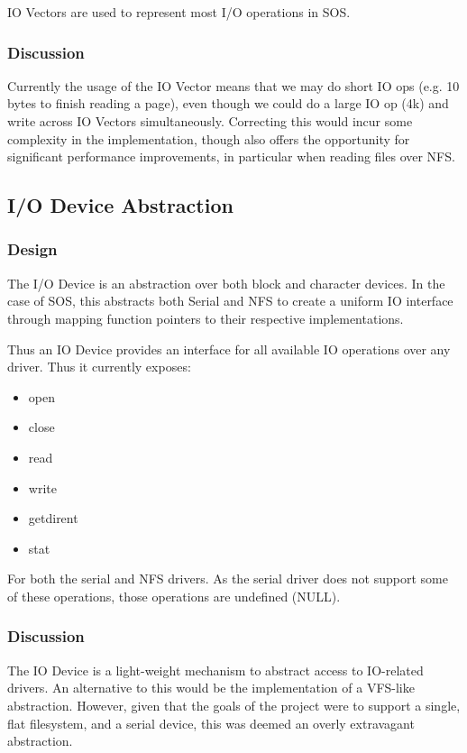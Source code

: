 \documentclass[a4paper,12pt]{article}
\begin{document}
IO Vectors are used to represent most I/O operations in SOS.

\subsubsection{Discussion}
Currently the usage of the IO Vector means that we may do short IO ops
(e.g. 10 bytes to finish reading a page), even though we could do a large IO
op (4k) and write across IO Vectors simultaneously.  Correcting this would
incur some complexity in the implementation, though also offers the
opportunity for significant performance improvements, in particular when
reading files over NFS.


\subsection{I/O Device Abstraction}
\subsubsection{Design}
The I/O Device is an abstraction over both block and character devices.  In
the case of SOS, this abstracts both Serial and NFS to create a uniform IO
interface through mapping function pointers to their respective
implementations.

Thus an IO Device provides an interface for all available IO operations over
any driver.  Thus it currently exposes:

\begin{itemize}
\item open
\item close
\item read
\item write
\item getdirent
\item stat
\end{itemize}

For both the serial and NFS drivers.  As the serial driver does not support
some of these operations, those operations are undefined (NULL).

\subsubsection{Discussion}
The IO Device is a light-weight mechanism to abstract access to IO-related
drivers.  An alternative to this would be the implementation of a VFS-like
abstraction.  However, given that the goals of the project were to support a
single, flat filesystem, and a serial device, this was deemed an overly
extravagant abstraction.
\end{document}
